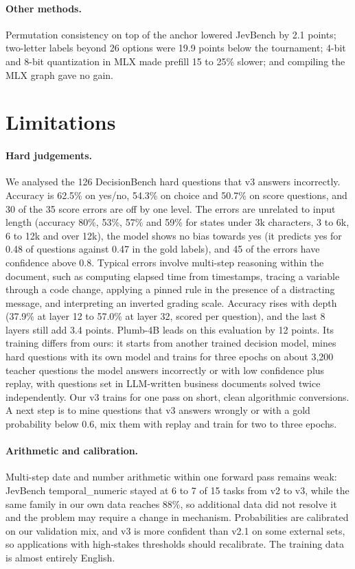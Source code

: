 \documentclass[10pt]{article}
\begin{document}
\paragraph{Other methods.}
Permutation consistency on top of the anchor lowered JevBench by 2.1 points; two-letter labels beyond 26 options were 19.9 points below the tournament; 4-bit and 8-bit quantization in MLX made prefill 15 to 25\% slower; and compiling the MLX graph gave no gain.

\section{Limitations}

\paragraph{Hard judgements.}
We analysed the 126 DecisionBench hard questions that v3 answers incorrectly.
Accuracy is 62.5\% on yes/no, 54.3\% on choice and 50.7\% on score questions, and 30 of the 35 score errors are off by one level.
The errors are unrelated to input length (accuracy 80\%, 53\%, 57\% and 59\% for states under 3k characters, 3 to 6k, 6 to 12k and over 12k), the model shows no bias towards yes (it predicts yes for 0.48 of questions against 0.47 in the gold labels), and 45 of the errors have confidence above 0.8.
Typical errors involve multi-step reasoning within the document, such as computing elapsed time from timestamps, tracing a variable through a code change, applying a pinned rule in the presence of a distracting message, and interpreting an inverted grading scale.
Accuracy rises with depth (37.9\% at layer 12 to 57.0\% at layer 32, scored per question), and the last 8 layers still add 3.4 points.
Plumb-4B leads on this evaluation by 12 points. Its training differs from ours: it starts from another trained decision model, mines hard questions with its own model and trains for three epochs on about 3,200 teacher questions the model answers incorrectly or with low confidence plus replay, with questions set in LLM-written business documents solved twice independently.
Our v3 trains for one pass on short, clean algorithmic conversions.
A next step is to mine questions that v3 answers wrongly or with a gold probability below 0.6, mix them with replay and train for two to three epochs.

\paragraph{Arithmetic and calibration.}
Multi-step date and number arithmetic within one forward pass remains weak: JevBench temporal\_numeric stayed at 6 to 7 of 15 tasks from v2 to v3, while the same family in our own data reaches 88\%, so additional data did not resolve it and the problem may require a change in mechanism.
Probabilities are calibrated on our validation mix, and v3 is more confident than v2.1 on some external sets, so applications with high-stakes thresholds should recalibrate.
The training data is almost entirely English.
\end{document}
